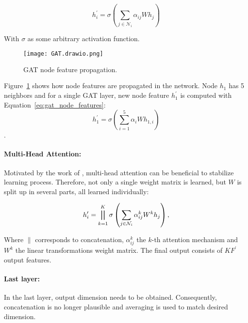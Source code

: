 \begin{equation}
  h_i^{\prime} = \sigma \left( \sum_{j \in \mathcal{N}_i} \alpha_{ij} W h_j \right)
  \label{eq:gat_node_features}
\end{equation}

With $\sigma$ as some arbitrary activation function.

\begin{minipage}{0.45\textwidth}
  \begin{figure}[H]
    \texttt{[image: GAT.drawio.png]}
    \caption{GAT node feature propagation.}
    \label{fig:gat_attention_illustration}
  \end{figure}
  \end{minipage} \hfill
  \begin{minipage}{0.5\textwidth}
    Figure~\ref{fig:gat_attention_illustration} shows how node features are propagated
    in the network.
    Node $h_1$ has 5 neighbors and for a single GAT layer, new node feature $h_1^{\prime}$
    is computed with Equation~\ref{eq:gat_node_features}: 
    $$h_{1}^{\prime} = \sigma \left( \sum_{i=1}^5\alpha_iWh_{1,i} \right)$$.

  \end{minipage}


\paragraph{Multi-Head Attention:}
Motivated by the work of \citet{transformer}, multi-head attention can be beneficial to stabilize learning process.
Therefore, not only a single weight matrix is learned, but $W$ is split up in several parts, 
all learned individually:

\begin{equation}
  h_i^{\prime} = \bigparallel^K_{k=1} \sigma \left(\sum_{j \in \mathcal{N}_i} \alpha_{ij}^k W^k h_j \right),  
\end{equation}

Where $\parallel$ corresponds to concatenation, $\alpha_{ij}^k$ the $k$-th attention mechanism and $W^k$ the linear
transformations weight matrix. The final output consists of $KF^{\prime}$ output features.

\paragraph{Last layer:}
In the last layer, output dimension needs to be obtained. 
Consequently, concatenation is no longer plausible and averaging is used to match desired dimension.

